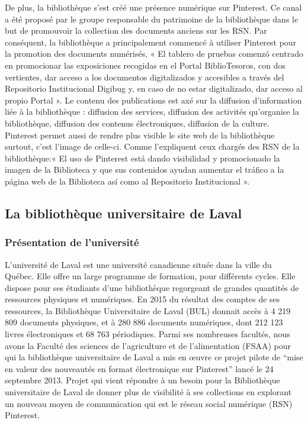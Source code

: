 \documentclass[a4paper,11pt]{article} %
\begin{document}
De plus, la bibliothèque s’est créé une présence numérique sur Pinterest. Ce canal a été proposé par le groupe responsable du patrimoine de la bibliothèque dans le but de promouvoir la collection des documents anciens sur les RSN.\citep{fernandez2016redes,} Par conséquent, la bibliothèque a principalement commencé à utiliser Pinterest pour la promotion des documents numérisés, « El tablero de pruebas comenzó centrado en promocionar las exposiciones recogidas en el Portal BiblioTesoros, con dos vertientes, dar acceso a los documentos digitalizados y accesibles a través del Repositorio Institucional Digibug y, en caso de no estar digitalizado, dar acceso al propio Portal »\citep{fernandez2016redes,}. Le contenu des publications est axé sur la diffusion d’information liée à la bibliothèque : diffusion des services, diffusion des activités qu’organise la bibliothèque, diffusion des contenus électroniques, diffusion de la culture. Pinterest permet aussi de rendre plus visible le site web de la bibliothèque surtout, c’est l’image de celle-ci. Comme l’expliquent ceux chargés des RSN de la bibliothèque:« El uso de Pinterest está dando visibilidad y promocionado la imagen de la Biblioteca y que sus contenidos ayudan aumentar el tráfico a la página web de la Biblioteca así como al Repositorio Institucional ».\citep{fernandez2016redes,}

\subsection{La bibliothèque universitaire de Laval }

\subsubsection{ Présentation de l’université}

L’université de Laval est une université canadienne située dans la ville du Québec. Elle 
offre un large programme de formation, pour différents cycles. Elle dispose pour ses étudiants 
d’une bibliothèque regorgeant de grandes quantités de ressources physiques et numériques. En 
2015 du résultat des comptes de ses ressources, la Bibliothèque Universitaire de Laval (BUL) 
donnait accès à 4 219 809 documents physiques, et à 280 886 documents numériques, dont 212 
123 livres électroniques et 68 763 périodiques. Parmi ses nombreuses facultés, nous avons la 
Faculté des sciences de l’agriculture et de l’alimentation (FSAA) pour qui la bibliothèque 
universitaire de Laval a mis en œuvre ce projet pilote de “mise en valeur des nouveautés en 
format électronique sur Pinterest” lancé le 24 septembre 2013. Projet qui vient répondre à un 
besoin pour la Bibliothèque universitaire de Laval de donner plus de visibilité à ses collections 
en explorant un nouveau moyen de communication qui est le réseau social numérique (RSN) 
Pinterest.
\end{document}
